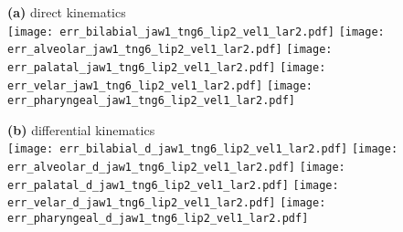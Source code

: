 \documentclass[varwidth=7.5in]{standalone}
\begin{document}
\raggedright

{\bf (a)} direct kinematics\\
\texttt{[image: err\_bilabial\_jaw1\_tng6\_lip2\_vel1\_lar2.pdf]}%
\texttt{[image: err\_alveolar\_jaw1\_tng6\_lip2\_vel1\_lar2.pdf]}%
\texttt{[image: err\_palatal\_jaw1\_tng6\_lip2\_vel1\_lar2.pdf]}%
\texttt{[image: err\_velar\_jaw1\_tng6\_lip2\_vel1\_lar2.pdf]}%
\texttt{[image: err\_pharyngeal\_jaw1\_tng6\_lip2\_vel1\_lar2.pdf]}

{\bf (b)} differential kinematics\\
\texttt{[image: err\_bilabial\_d\_jaw1\_tng6\_lip2\_vel1\_lar2.pdf]}%
\texttt{[image: err\_alveolar\_d\_jaw1\_tng6\_lip2\_vel1\_lar2.pdf]}%
\texttt{[image: err\_palatal\_d\_jaw1\_tng6\_lip2\_vel1\_lar2.pdf]}%
\texttt{[image: err\_velar\_d\_jaw1\_tng6\_lip2\_vel1\_lar2.pdf]}%
\texttt{[image: err\_pharyngeal\_d\_jaw1\_tng6\_lip2\_vel1\_lar2.pdf]}
\end{document}
